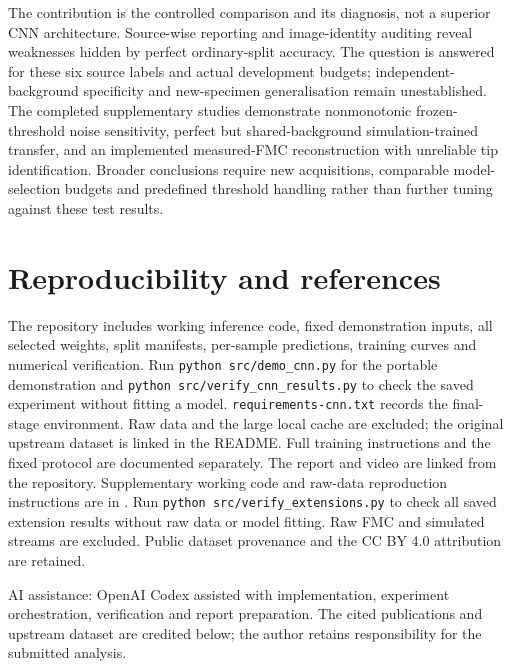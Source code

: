 \documentclass[11pt,a4paper]{article}
\begin{document}
The contribution is the controlled comparison and its diagnosis, not a superior CNN architecture. Source-wise reporting and image-identity auditing reveal weaknesses hidden by perfect ordinary-split accuracy. The question is answered for these six source labels and actual development budgets; independent-background specificity and new-specimen generalisation remain unestablished. The completed supplementary studies demonstrate nonmonotonic frozen-threshold noise sensitivity, perfect but shared-background simulation-trained transfer, and an implemented measured-FMC reconstruction with unreliable tip identification. Broader conclusions require new acquisitions, comparable model-selection budgets and predefined threshold handling rather than further tuning against these test results.

\FloatBarrier
\section{Reproducibility and references}

The repository includes working inference code, fixed demonstration inputs, all selected weights, split manifests, per-sample predictions, training curves and numerical verification. Run \texttt{python src/demo\_cnn.py} for the portable demonstration and \texttt{python src/verify\_cnn\_results.py} to check the saved experiment without fitting a model. \texttt{requirements-cnn.txt} records the final-stage environment. Raw data and the large local cache are excluded; the original upstream dataset is linked in the README. Full training instructions and the fixed protocol are documented separately. The report and video are linked from the repository. Supplementary working code and raw-data reproduction instructions are in . Run \texttt{python src/verify\_extensions.py} to check all saved extension results without raw data or model fitting. Raw FMC and simulated streams are excluded. Public dataset provenance and the CC BY 4.0 attribution are retained.

AI assistance: OpenAI Codex assisted with implementation, experiment orchestration, verification and report preparation. The cited publications and upstream dataset are credited below; the author retains responsibility for the submitted analysis.

\FloatBarrier

\begingroup\small\setlength{\parskip}{0pt}
\end{document}
